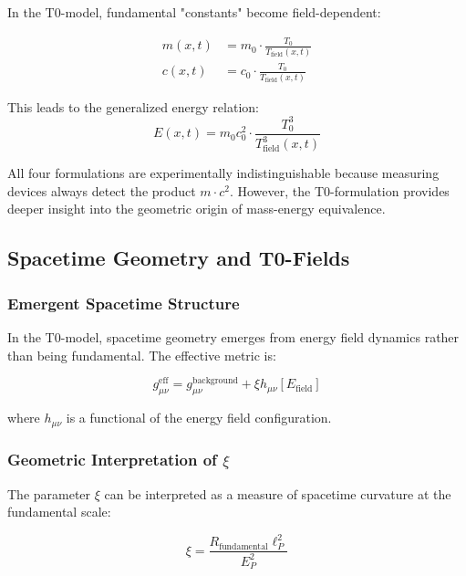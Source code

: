 \documentclass[12pt,a4paper]{article}
\theoremstyle{definition}
\begin{document}
	In the T0-model, fundamental "constants" become field-dependent:
	
	\begin{align}
		m(x,t) &= m_0 \cdot \frac{T_0}{T_{\text{field}}(x,t)} \\
		c(x,t) &= c_0 \cdot \frac{T_0}{T_{\text{field}}(x,t)}
	\end{align}
	
	This leads to the generalized energy relation:
	\begin{equation}
		E(x,t) = m_0 c_0^2 \cdot \frac{T_0^3}{T_{\text{field}}^3(x,t)}
	\end{equation}
	
	\begin{wichtig}
		All four formulations are experimentally indistinguishable because measuring devices always detect the product $m \cdot c^2$. However, the T0-formulation provides deeper insight into the geometric origin of mass-energy equivalence.
	\end{wichtig}
	
	\subsection{Spacetime Geometry and T0-Fields}
	
	\subsubsection{Emergent Spacetime Structure}
	
	In the T0-model, spacetime geometry emerges from energy field dynamics rather than being fundamental. The effective metric is:
	
	\begin{equation}
		g_{\mu\nu}^{\text{eff}} = g_{\mu\nu}^{\text{background}} + \xi h_{\mu\nu}[E_{\text{field}}]
	\end{equation}
	
	where $h_{\mu\nu}$ is a functional of the energy field configuration.
	
	\subsubsection{Geometric Interpretation of $\xi$}
	
	The parameter $\xi$ can be interpreted as a measure of spacetime curvature at the fundamental scale:
	
	\begin{equation}
		\xi = \frac{R_{\text{fundamental}} \ell_P^2}{E_P^2}
	\end{equation}
	
\end{document}
